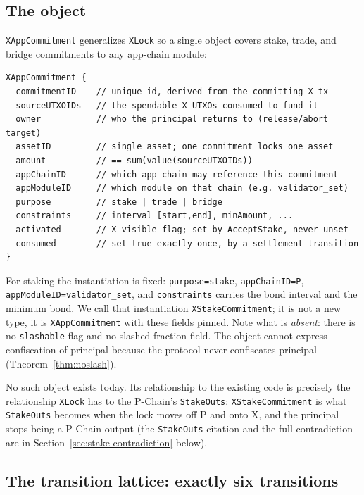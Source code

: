 \subsection{The object}

\texttt{XAppCommitment} generalizes \texttt{XLock} so a single object
covers stake, trade, and bridge commitments to any app-chain module:

\begin{lstlisting}
XAppCommitment {
  commitmentID    // unique id, derived from the committing X tx
  sourceUTXOIDs   // the spendable X UTXOs consumed to fund it
  owner           // who the principal returns to (release/abort target)
  assetID         // single asset; one commitment locks one asset
  amount          // == sum(value(sourceUTXOIDs))
  appChainID      // which app-chain may reference this commitment
  appModuleID     // which module on that chain (e.g. validator_set)
  purpose         // stake | trade | bridge
  constraints     // interval [start,end], minAmount, ...
  activated       // X-visible flag; set by AcceptStake, never unset
  consumed        // set true exactly once, by a settlement transition
}
\end{lstlisting}

\noindent For staking the instantiation is fixed: \texttt{purpose=stake},
\texttt{appChainID=P}, \texttt{appModuleID=validator\_set}, and
\texttt{constraints} carries the bond interval and the minimum bond. We
call that instantiation \texttt{XStakeCommitment}; it is not a new type,
it is \texttt{XAppCommitment} with these fields pinned. Note what is
\emph{absent}: there is no \texttt{slashable} flag and no slashed-fraction
field. The object cannot express confiscation of principal because the
protocol never confiscates principal (Theorem~\ref{thm:noslash}).

\DESIGN{} No such object exists today. Its relationship to the existing
code is precisely the relationship \texttt{XLock} has to the P-Chain's
\texttt{StakeOuts}: \texttt{XStakeCommitment} is what \texttt{StakeOuts}
becomes when the lock moves off P and onto X, and the principal stops
being a P-Chain output (the \texttt{StakeOuts} citation and the full
contradiction are in Section~\ref{sec:stake-contradiction} below).

\subsection{The transition lattice: exactly six transitions}
\label{sec:stake-transitions}

